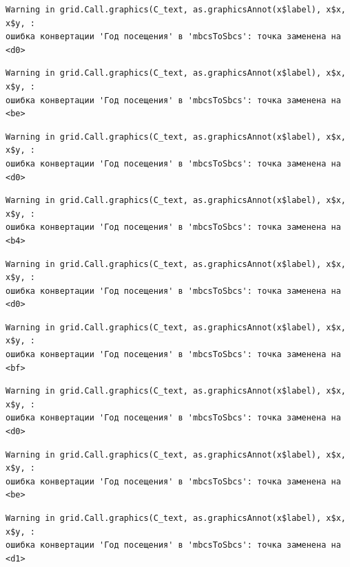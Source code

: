 \documentclass[
  letterpaper,
  DIV=11,
  numbers=noendperiod]{scrreprt}
\begin{document}
\begin{verbatim}
Warning in grid.Call.graphics(C_text, as.graphicsAnnot(x$label), x$x, x$y, :
ошибка конвертации 'Год посещения' в 'mbcsToSbcs': точка заменена на <d0>
\end{verbatim}

\begin{verbatim}
Warning in grid.Call.graphics(C_text, as.graphicsAnnot(x$label), x$x, x$y, :
ошибка конвертации 'Год посещения' в 'mbcsToSbcs': точка заменена на <be>
\end{verbatim}

\begin{verbatim}
Warning in grid.Call.graphics(C_text, as.graphicsAnnot(x$label), x$x, x$y, :
ошибка конвертации 'Год посещения' в 'mbcsToSbcs': точка заменена на <d0>
\end{verbatim}

\begin{verbatim}
Warning in grid.Call.graphics(C_text, as.graphicsAnnot(x$label), x$x, x$y, :
ошибка конвертации 'Год посещения' в 'mbcsToSbcs': точка заменена на <b4>
\end{verbatim}

\begin{verbatim}
Warning in grid.Call.graphics(C_text, as.graphicsAnnot(x$label), x$x, x$y, :
ошибка конвертации 'Год посещения' в 'mbcsToSbcs': точка заменена на <d0>
\end{verbatim}

\begin{verbatim}
Warning in grid.Call.graphics(C_text, as.graphicsAnnot(x$label), x$x, x$y, :
ошибка конвертации 'Год посещения' в 'mbcsToSbcs': точка заменена на <bf>
\end{verbatim}

\begin{verbatim}
Warning in grid.Call.graphics(C_text, as.graphicsAnnot(x$label), x$x, x$y, :
ошибка конвертации 'Год посещения' в 'mbcsToSbcs': точка заменена на <d0>
\end{verbatim}

\begin{verbatim}
Warning in grid.Call.graphics(C_text, as.graphicsAnnot(x$label), x$x, x$y, :
ошибка конвертации 'Год посещения' в 'mbcsToSbcs': точка заменена на <be>
\end{verbatim}

\begin{verbatim}
Warning in grid.Call.graphics(C_text, as.graphicsAnnot(x$label), x$x, x$y, :
ошибка конвертации 'Год посещения' в 'mbcsToSbcs': точка заменена на <d1>
\end{verbatim}
\end{document}

